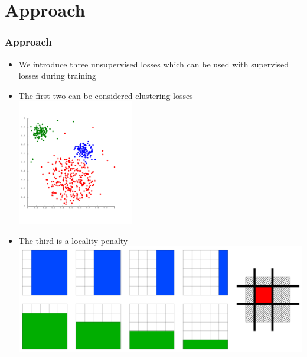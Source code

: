\section{Approach}
\begin{frame}
	\frametitle{Approach}
	\begin{itemize}
		\item We introduce three unsupervised losses which can be used with supervised losses during
			training
		\item The first two can be considered clustering losses
			\includegraphics[width=0.4\textwidth, height=0.2\textwidth, center]{images/clust2}
		\item The third is a locality penalty
			\includegraphics[scale=0.3, center]{images/locality}
	\end{itemize}
\end{frame}











